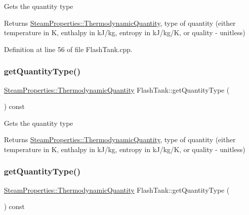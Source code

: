 Gets the quantity type \begin{DoxyReturn}{Returns}
\hyperlink{class_steam_properties_ae0294bedf7d178c2d8fb6aed0f62fbff}{Steam\+Properties\+::\+Thermodynamic\+Quantity}, type of quantity (either temperature in K, enthalpy in k\+J/kg, entropy in k\+J/kg/K, or quality -\/ unitless) 
\end{DoxyReturn}


Definition at line 56 of file Flash\+Tank.\+cpp.

\mbox{\label{class_flash_tank_a1800317a9b9dd8ff8fb18c693e846a45}} 
\subsubsection{\texorpdfstring{get\+Quantity\+Type()}{getQuantityType()}\hspace{0.1cm}{\footnotesize\ttfamily [2/3]}}
{\footnotesize\ttfamily \hyperlink{class_steam_properties_ae0294bedf7d178c2d8fb6aed0f62fbff}{Steam\+Properties\+::\+Thermodynamic\+Quantity} Flash\+Tank\+::get\+Quantity\+Type (\begin{DoxyParamCaption}{ }\end{DoxyParamCaption}) const}

Gets the quantity type \begin{DoxyReturn}{Returns}
\hyperlink{class_steam_properties_ae0294bedf7d178c2d8fb6aed0f62fbff}{Steam\+Properties\+::\+Thermodynamic\+Quantity}, type of quantity (either temperature in K, enthalpy in k\+J/kg, entropy in k\+J/kg/K, or quality -\/ unitless) 
\end{DoxyReturn}
\mbox{\label{class_flash_tank_a1800317a9b9dd8ff8fb18c693e846a45}} 
\subsubsection{\texorpdfstring{get\+Quantity\+Type()}{getQuantityType()}\hspace{0.1cm}{\footnotesize\ttfamily [3/3]}}
{\footnotesize\ttfamily \hyperlink{class_steam_properties_ae0294bedf7d178c2d8fb6aed0f62fbff}{Steam\+Properties\+::\+Thermodynamic\+Quantity} Flash\+Tank\+::get\+Quantity\+Type (\begin{DoxyParamCaption}{ }\end{DoxyParamCaption}) const}


